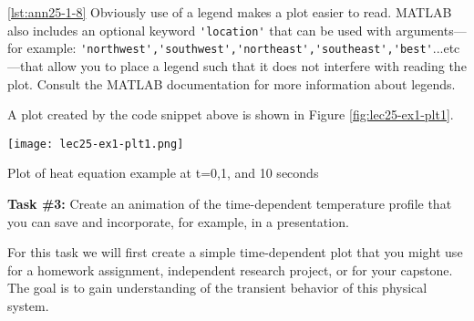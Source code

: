 \vspace{0.15cm}

\noindent \ref{lst:ann25-1-8} Obviously use of a legend makes a plot easier to read.  MATLAB also includes an optional keyword \lstinline{'location'} that can be used with arguments---for example: \lstinline{'northwest','southwest','northeast','southeast','best'}...etc---that allow you to place a legend such that it does not interfere with reading the plot.  Consult the MATLAB documentation for more information about legends.

\vspace{0.15cm}

\noindent A plot created by the code snippet above is shown in Figure \ref{fig:lec25-ex1-plt1}.
\begin{marginfigure}
\texttt{[image: lec25-ex1-plt1.png]}
\caption{Plot of heat equation example at t=0,1, and 10 seconds}
\label{fig:lec25-ex1-plt1}
\end{marginfigure}

\vspace{0.25cm}

\setcounter{lstannotation}{0} %
\noindent\textbf{Task \#3: } Create an animation of the time-dependent temperature profile that you can save and incorporate, for example, in a presentation.

\vspace{0.15cm}

\noindent For this task we will first create a simple time-dependent plot that you might use for a homework assignment, independent research project, or for your capstone.  The goal is to gain understanding of the transient behavior of this physical system.

